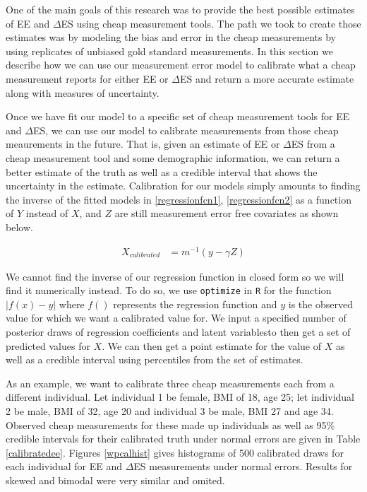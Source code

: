 \documentclass[11pt]{article}\usepackage[]{graphicx}\usepackage[]{color}
\begin{document}
One of the main goals of this research was to provide the best possible estimates of EE and $\Delta$ES using cheap measurement tools. The path we took to create those estimates was by modeling the bias and error in the cheap measurements by using replicates of unbiased gold standard measurements. In this section we describe how we can use our measurement error model to calibrate what a cheap measurement reports for either EE or $\Delta$ES and return a more accurate estimate along with measures of uncertainty. 

Once we have fit our model to a specific set of cheap measurement tools for EE and $\Delta$ES, we can use our model to calibrate measurements from those cheap meaurements in the future. That is, given an estimate of EE or $\Delta$ES from a cheap measurement tool and some demographic information, we can return a better estimate of the truth as well as a credible interval that shows the uncertainty in the estimate. Calibration for our models simply amounts to finding the inverse of the fitted models in \eqref{regressionfcn1}, \eqref{regressionfcn2} as a function of $Y$ instead of $X$, and $Z$ are still measurement error free covariates as shown below.

\begin{align}
  X_{calibrated} &= m^{-1}(y-\gamma Z) 
\end{align}

We cannot find the inverse of our regression function in closed form so we will find it numerically instead. To do so, we use \texttt{optimize} in \texttt{R} for the function $|f(x)-y|$ where $f()$ represents the regression function and $y$ is the observed value for which we want a calibrated value for. We input a specified number of posterior draws of regression coefficients and latent variablesto then get a set of predicted values for $X$. We can then get a point estimate for the value of $X$ as well as a credible interval using percentiles from the set of estimates.


As an example, we want to calibrate three cheap measurements each from a different individual. Let individual 1 be female, BMI of 18, age 25; let individual 2 be male, BMI of 32, age 20 and individual 3 be male, BMI 27 and age 34. Observed cheap measurements for these made up individuals as well as 95\% credible intervals for their calibrated truth under normal errors are given in Table \ref{calibratedee}. Figures \ref{wpcalhist} gives histograms of 500 calibrated draws for each individual for EE and $\Delta$ES measurements under normal errors. Results for skewed and bimodal were very similar and omited.
\end{document}
